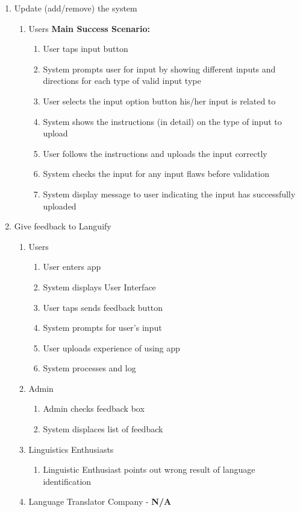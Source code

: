 \begin{enumerate}[{\bf BE1.}]
	\item Update (add/remove) the system
	\begin{enumerate}[{\bf VP1.}]
		\item Users
		\textbf{Main Success Scenario:}
		\begin{enumerate}[{\bf 1.}]
			\item User taps input button 
			\item System prompts user for input by showing different inputs and directions for each type of valid input type
			\item User selects the input option button his/her input is  related to
			\item System shows the instructions (in detail) on the type of input to upload
			\item User follows the instructions and uploads the input correctly
			\item System checks the input for any input flaws before validation
			\item System display message to user indicating the input has successfully uploaded
		\end{enumerate}
	\end{enumerate}

	\item Give feedback to Languify
	\begin{enumerate}[{\bf VP1.}]
		\item Users
		\begin{enumerate}[{\bf 1.}]
			\item User enters app
			\item System displays User Interface
			\item User taps sends feedback button
			\item System prompts for user’s input
			\item User uploads experience of using app
			\item System processes and log
			
		\end{enumerate}
		\item Admin
		\begin{enumerate}[{\bf 1.}, resume]
			\item Admin checks feedback box
			\item System displaces list of feedback
			
		\end{enumerate}
		\item Linguistics Enthusiasts
		\begin{enumerate}[{\bf 4.i}]
			\item Linguistic Enthusiast points out wrong result of language identification
		\end{enumerate}
		\item Language Translator Company - \textbf{N/A}
	\end{enumerate}



\end{enumerate}
